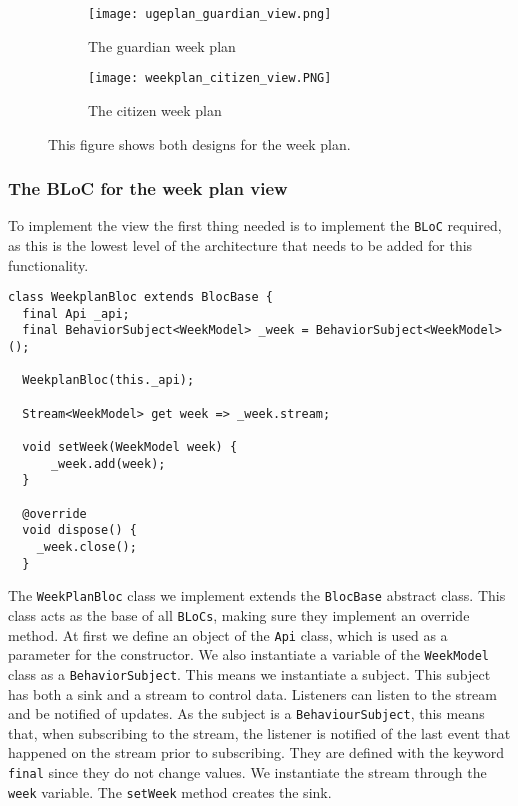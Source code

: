\begin{figure}[H]
  \begin{subfigure}{0.5\textwidth}
  \texttt{[image: ugeplan\_guardian\_view.png]} 
  \caption{The guardian week plan}
  \label{fig:story_weekplan_guardian}
  \end{subfigure}
  \begin{subfigure}{0.5\textwidth}
      \texttt{[image: weekplan\_citizen\_view.PNG]}
  \caption{The citizen week plan}
  \label{fig:story_weekplan_citizen}
  \end{subfigure} 
  \caption{This figure shows both designs for the week plan.}
  \label{fig:story_weekplan_views}
\end{figure}

\subsubsection{The BLoC for the week plan view}
To implement the view the first thing needed is to implement the \texttt{BLoC} required, as this is the lowest level of the architecture that needs to be added for this functionality.

\begin{lstlisting}[caption={The week plan BLoC},label={lst:weekplanbloc}]
  class WeekplanBloc extends BlocBase {
  final Api _api;
  final BehaviorSubject<WeekModel> _week = BehaviorSubject<WeekModel>();

  WeekplanBloc(this._api);

  Stream<WeekModel> get week => _week.stream;

  void setWeek(WeekModel week) {
      _week.add(week);
  }

  @override
  void dispose() {
    _week.close();
  }
\end{lstlisting}
The \texttt{WeekPlanBloc} class we implement extends the \texttt{BlocBase} abstract class.
This class acts as the base of all \texttt{BLoCs}, making sure they implement an override method.
At first we define an object of the \texttt{Api} class, which is used as a parameter for the constructor. 
We also instantiate a variable of the \texttt{WeekModel} class as a \texttt{BehaviorSubject}.
This means we instantiate a subject.
This subject has both a sink and a stream to control data.
Listeners can listen to the stream and be notified of updates.
As the subject is a \texttt{BehaviourSubject}, this means that, when subscribing to the stream, the listener is notified of the last event that happened on the stream prior to subscribing.
They are defined with the keyword \texttt{final} since they do not change values.
We instantiate the stream through the \texttt{week} variable.
The \texttt{setWeek} method creates the sink.


